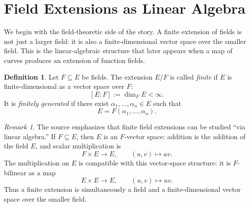 \documentclass[11pt]{article}
\theoremstyle{definition}
\newtheorem{definition}[theorem]{Definition}
\theoremstyle{remark}
\newtheorem{remark}[theorem]{Remark}
\begin{document}
\section{Field Extensions as Linear Algebra}

We begin with the field-theoretic side of the story.  A finite extension of
fields is not just a larger field: it is also a finite-dimensional vector space
over the smaller field.  This is the linear-algebraic structure that later
appears when a map of curves produces an extension of function fields.

\begin{definition}
Let \(F \subseteq E\) be fields.  The extension \(E/F\) is called
\emph{finite} if \(E\) is finite-dimensional as a vector space over \(F\):
\[
  [E:F]:=\dim_F E<\infty.
\]
It is \emph{finitely generated} if there exist
\(\alpha_1,\ldots,\alpha_n\in E\) such that
\[
  E=F(\alpha_1,\ldots,\alpha_n).
\]
\end{definition}

\begin{remark}
The source emphasizes that finite field extensions can be studied ``via
linear algebra.''  If \(F\subseteq E\), then \(E\) is an \(F\)-vector space:
addition is the addition of the field \(E\), and scalar multiplication is
\[
  F\times E\longrightarrow E,\qquad (a,v)\longmapsto av.
\]
The multiplication on \(E\) is compatible with this vector-space structure:
it is \(F\)-bilinear as a map
\[
  E\times E\longrightarrow E,\qquad (u,v)\longmapsto uv.
\]
Thus a finite extension is simultaneously a field and a finite-dimensional
vector space over the smaller field.
\end{remark}
\end{document}
